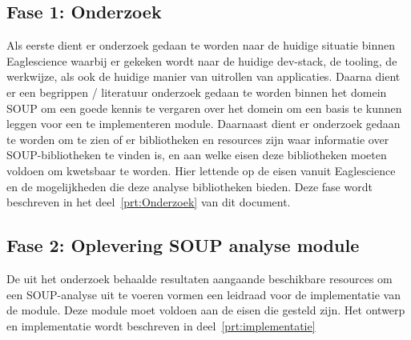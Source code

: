 \subsection{Fase 1: Onderzoek} \label{subsec:fase-1:-onderzoek}
Als eerste dient er onderzoek gedaan te worden naar de huidige situatie binnen Eaglescience waarbij er gekeken wordt naar de huidige dev-stack, de tooling, de werkwijze, als ook de huidige manier van uitrollen van applicaties. Daarna dient er een begrippen / literatuur onderzoek gedaan te worden binnen het domein SOUP om een goede kennis te vergaren over het domein om een basis te kunnen leggen voor een te implementeren module. Daarnaast dient er onderzoek gedaan te worden om te zien of er bibliotheken en resources zijn waar informatie over SOUP-bibliotheken te vinden is, en aan welke eisen deze bibliotheken moeten voldoen om kwetsbaar te worden. Hier lettende op de eisen vanuit Eaglescience en de mogelijkheden die deze analyse bibliotheken bieden. Deze fase wordt beschreven in het deel~\ref{prt:Onderzoek} van dit document.

\subsection{Fase 2: Oplevering SOUP analyse module}\label{subsec:fase-2:-oplevering-soup-analyse-module}
De uit het onderzoek behaalde resultaten aangaande beschikbare resources om een SOUP-analyse uit te voeren vormen een leidraad voor de implementatie van de module. Deze module moet voldoen aan de eisen die gesteld zijn. Het ontwerp en implementatie wordt beschreven in deel~\ref{prt:implementatie}
